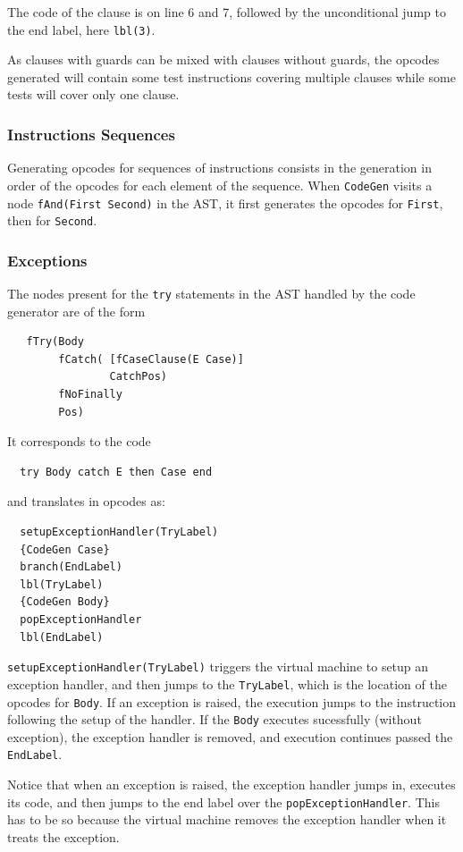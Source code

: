 \documentclass[a4paper]{memoir}
\begin{document}
The code of the clause is on line 6 and 7, followed by the unconditional jump to
the end label, here \lstinline!lbl(3)!.

As clauses with guards can be mixed with clauses without guards, the opcodes
generated will contain some test instructions covering multiple clauses while
some tests will cover only one clause.

\subsubsection{Instructions Sequences}
Generating opcodes for sequences of instructions consists in the generation in order of the opcodes for each element of the sequence. 
When \lstinline!CodeGen! visits a node \lstinline!fAnd(First Second)! in the AST, it first generates the opcodes for \lstinline!First!, then for \lstinline!Second!.


\subsubsection{Exceptions}\label{sec:arch:codegen:exceptions}
The nodes present for the \lstinline!try! statements in the AST handled by the
code generator are of the form
\begin{lstlisting}
   fTry(Body 
        fCatch( [fCaseClause(E Case)] 
                CatchPos) 
        fNoFinally 
        Pos)
\end{lstlisting}
It corresponds to the code
\begin{lstlisting}
  try Body catch E then Case end
\end{lstlisting}
and translates in opcodes as:
\begin{lstlisting}
  setupExceptionHandler(TryLabel)
  {CodeGen Case}
  branch(EndLabel)
  lbl(TryLabel)
  {CodeGen Body}
  popExceptionHandler
  lbl(EndLabel)
\end{lstlisting}

\lstinline!setupExceptionHandler(TryLabel)! triggers the virtual machine to setup an
exception handler, and then jumps to the \lstinline!TryLabel!, which is the
location of the opcodes for \lstinline!Body!. If an exception is raised, the
execution jumps to the instruction following the setup of the handler. If the
\lstinline!Body! executes sucessfully (without exception), the exception handler
is removed, and execution continues passed the \lstinline!EndLabel!.

Notice that when an exception is raised, the exception handler jumps in,
executes its code, and then jumps to the end label over the
\lstinline!popExceptionHandler!. This has to be so because the virtual
machine removes the exception handler when it treats the exception.
\end{document}

